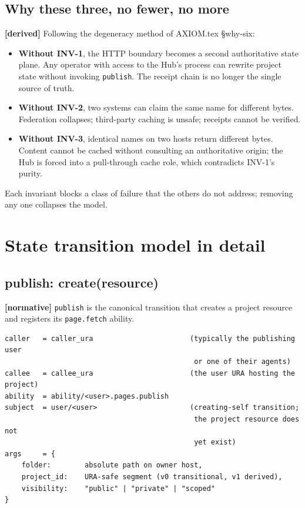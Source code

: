 \documentclass[11pt,a4paper]{article}
\newcommand{\normsv}{\textcolor{normativecolor}{\textbf{[normative]}}\xspace}
\newcommand{\derived}{\textcolor{derivedcolor}{\textbf{[derived]}}\xspace}
\theoremstyle{definition}
\begin{document}
\subsection{Why these three, no fewer, no more}

\derived{} Following the degeneracy method of AXIOM.tex §why-six:

\begin{itemize}[leftmargin=2em,itemsep=0.18em]
    \item \textbf{Without INV-1}, the HTTP boundary becomes a
    second authoritative state plane. Any operator with access
    to the Hub's process can rewrite project state without
    invoking \texttt{publish}. The receipt chain is no longer
    the single source of truth.
    \item \textbf{Without INV-2}, two systems can claim the
    same name for different bytes. Federation collapses;
    third-party caching is unsafe; receipts cannot be verified.
    \item \textbf{Without INV-3}, identical names on two hosts
    return different bytes. Content cannot be cached without
    consulting an authoritative origin; the Hub is forced into
    a pull-through cache role, which contradicts INV-1's
    purity.
\end{itemize}

Each invariant blocks a class of failure that the others do
not address; removing any one collapses the model.

\section{State transition model in detail}
\label{sec:transitions}

\subsection{publish: create(resource)}

\normsv{} \texttt{publish} is the canonical transition that
creates a project resource and registers its
\texttt{page.fetch} ability.

\begin{lstlisting}
caller   = caller_ura                       (typically the publishing user
                                             or one of their agents)
callee   = callee_ura                       (the user URA hosting the project)
ability  = ability/<user>.pages.publish
subject  = user/<user>                      (creating-self transition;
                                             the project resource does not
                                             yet exist)
args     = {
    folder:        absolute path on owner host,
    project_id:    URA-safe segment (v0 transitional, v1 derived),
    visibility:    "public" | "private" | "scoped"
}
\end{lstlisting}
\end{document}
